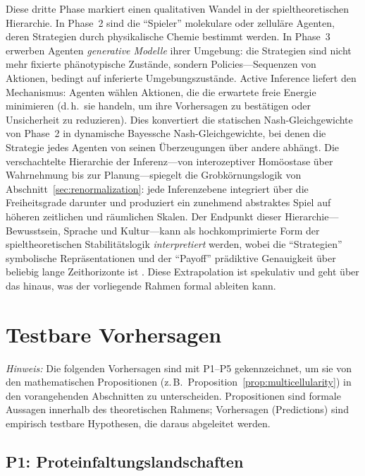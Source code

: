 \documentclass[12pt,a4paper]{article}
\theoremstyle{remark}
\begin{document}
Diese dritte Phase markiert einen qualitativen Wandel in der spieltheoretischen Hierarchie. In Phase~2 sind die ``Spieler'' molekulare oder zellul\"are Agenten, deren Strategien durch physikalische Chemie bestimmt werden. In Phase~3 erwerben Agenten \emph{generative Modelle} ihrer Umgebung: die Strategien sind nicht mehr fixierte ph\"anotypische Zust\"ande, sondern Policies---Sequenzen von Aktionen, bedingt auf inferierte Umgebungszust\"ande. Active Inference \citep{FristonFreeEnergy} liefert den Mechanismus: Agenten w\"ahlen Aktionen, die die erwartete freie Energie minimieren (d.\,h.\ sie handeln, um ihre Vorhersagen zu best\"atigen oder Unsicherheit zu reduzieren). Dies konvertiert die statischen Nash-Gleichgewichte von Phase~2 in dynamische Bayessche Nash-Gleichgewichte, bei denen die Strategie jedes Agenten von seinen \"Uberzeugungen \"uber andere abh\"angt. Die verschachtelte Hierarchie der Inferenz---von interozeptiver Hom\"oostase \"uber Wahrnehmung bis zur Planung---spiegelt die Grobk\"ornungslogik von Abschnitt~\ref{sec:renormalization}: jede Inferenzebene integriert \"uber die Freiheitsgrade darunter und produziert ein zunehmend abstraktes Spiel auf h\"oheren zeitlichen und r\"aumlichen Skalen. Der Endpunkt dieser Hierarchie---Bewusstsein, Sprache und Kultur---kann als hochkomprimierte Form der spieltheoretischen Stabilit\"atslogik \emph{interpretiert} werden, wobei die ``Strategien'' symbolische Repr\"asentationen und der ``Payoff'' pr\"adiktive Genauigkeit \"uber beliebig lange Zeithorizonte ist \citep{FristonPDF}. Diese Extrapolation ist spekulativ und geht \"uber das hinaus, was der vorliegende Rahmen formal ableiten kann.

\section{Testbare Vorhersagen}
\label{sec:predictions}

\noindent\textit{Hinweis:} Die folgenden Vorhersagen sind mit P1--P5 gekennzeichnet, um sie von den mathematischen Propositionen (z.\,B.\ Proposition~\ref{prop:multicellularity}) in den vorangehenden Abschnitten zu unterscheiden. Propositionen sind formale Aussagen innerhalb des theoretischen Rahmens; Vorhersagen (Predictions) sind empirisch testbare Hypothesen, die daraus abgeleitet werden.

\subsection{P1: Proteinfaltungslandschaften}
\end{document}
